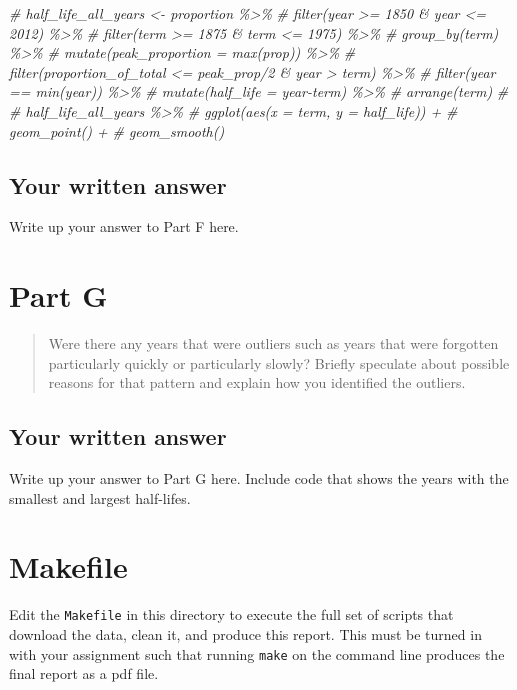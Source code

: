 \documentclass[
]{article}
\newenvironment{Shaded}{\begin{snugshade}}{\end{snugshade}}
\newcommand{\CommentTok}[1]{\textcolor[rgb]{0.56,0.35,0.01}{\textit{#1}}}
\begin{document}
\begin{Shaded}
\begin{Highlighting}[]
\CommentTok{\# half\_life\_all\_years \textless{}{-} proportion \%\textgreater{}\% }
\CommentTok{\#   filter(year \textgreater{}= 1850 \& year \textless{}= 2012) \%\textgreater{}\% }
\CommentTok{\#   filter(term \textgreater{}= 1875 \& term \textless{}= 1975) \%\textgreater{}\% }
\CommentTok{\#   group\_by(term) \%\textgreater{}\% }
\CommentTok{\#   mutate(peak\_proportion = max(prop)) \%\textgreater{}\% }
\CommentTok{\#   filter(proportion\_of\_total \textless{}= peak\_prop/2 \& year \textgreater{} term) \%\textgreater{}\%}
\CommentTok{\#   filter(year == min(year)) \%\textgreater{}\% }
\CommentTok{\#   mutate(half\_life = year{-}term) \%\textgreater{}\% }
\CommentTok{\#   arrange(term)}
\CommentTok{\# }
\CommentTok{\# half\_life\_all\_years \%\textgreater{}\% }
\CommentTok{\#   ggplot(aes(x = term, y = half\_life)) +}
\CommentTok{\#   geom\_point() +}
\CommentTok{\#   geom\_smooth()}
\end{Highlighting}
\end{Shaded}

\hypertarget{your-written-answer-4}{%
\subsection{Your written answer}\label{your-written-answer-4}}

Write up your answer to Part F here.

\hypertarget{part-g}{%
\section{Part G}\label{part-g}}

\begin{quote}
Were there any years that were outliers such as years that were
forgotten particularly quickly or particularly slowly? Briefly speculate
about possible reasons for that pattern and explain how you identified
the outliers.
\end{quote}

\hypertarget{your-written-answer-5}{%
\subsection{Your written answer}\label{your-written-answer-5}}

Write up your answer to Part G here. Include code that shows the years
with the smallest and largest half-lifes.

\hypertarget{makefile}{%
\section{Makefile}\label{makefile}}

Edit the \texttt{Makefile} in this directory to execute the full set of
scripts that download the data, clean it, and produce this report. This
must be turned in with your assignment such that running \texttt{make}
on the command line produces the final report as a pdf file.
\end{document}
